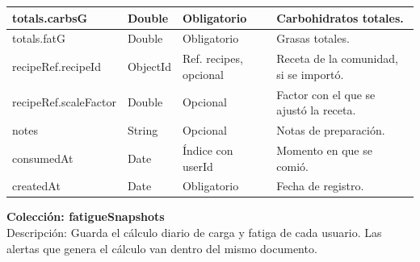 {\begin{longtable}{|>{\raggedright\arraybackslash}p{4.7cm}|>{\raggedright\arraybackslash}p{1.8cm}|>{\raggedright\arraybackslash}p{2.3cm}|>{\raggedright\arraybackslash}p{5.4cm}|}
    totals.\allowbreak carbsG & Double & Obligatorio & Carbohidratos totales. \\ \hline
    totals.\allowbreak fatG & Double & Obligatorio & Grasas totales. \\ \hline
    recipeRef.\allowbreak recipeId & ObjectId & Ref. recipes, opcional & Receta de la comunidad, si se importó. \\ \hline
    recipeRef.\allowbreak scaleFactor & Double & Opcional & Factor con el que se ajustó la receta. \\ \hline
    notes & String & Opcional & Notas de preparación. \\ \hline
    consumedAt & Date & Índice con userId & Momento en que se comió. \\ \hline
    createdAt & Date & Obligatorio & Fecha de registro. \\ \hline
\end{longtable}
}
\newpage
\noindent\textbf{Colección: fatigueSnapshots} \\
Descripción: Guarda el cálculo diario de carga y fatiga de cada usuario. Las alertas que genera el cálculo van dentro del mismo documento.
